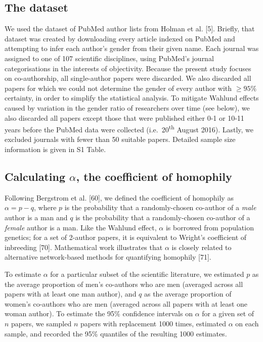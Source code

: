 \documentclass[12pt,]{article}
\begin{document}
\subsection{The dataset}\label{the-dataset}

We used the dataset of PubMed author lists from Holman et al. {[}5{]}.
Briefly, that dataset was created by downloading every article indexed
on PubMed and attempting to infer each author's gender from their given
name. Each journal was assigned to one of 107 scientific disciplines,
using PubMed's journal categorisations in the interests of objectivity.
Because the present study focuses on co-authorship, all single-author
papers were discarded. We also discarded all papers for which we could
not determine the gender of every author with \({\ge}95\%\) certainty,
in order to simplify the statistical analysis. To mitigate Wahlund
effects caused by variation in the gender ratio of researchers over time
(see below), we also discarded all papers except those that were
published either 0-1 or 10-11 years before the PubMed data were
collected (i.e.~20\textsuperscript{th} August 2016). Lastly, we excluded
journals with fewer than 50 suitable papers. Detailed sample size
information is given in S1 Table.

\subsection{\texorpdfstring{Calculating \(\alpha\), the coefficient of
homophily}{Calculating \textbackslash{}alpha, the coefficient of homophily}}\label{calculating-alpha-the-coefficient-of-homophily}

Following Bergstrom et al. {[}60{]}, we defined the coefficient of
homophily as \(\alpha = p - q\), where \(p\) is the probability that a
randomly-chosen co-author of a \emph{male} author is a man and \(q\) is
the probability that a randomly-chosen co-author of a \emph{female}
author is a man. Like the Wahlund effect, \(\alpha\) is borrowed from
population genetics; for a set of 2-author papers, it is equivalent to
Wright's coefficient of inbreeding {[}70{]}. Mathematical work
illustrates that \(\alpha\) is closely related to alternative
network-based methods for quantifying homophily {[}71{]}.

To estimate \(\alpha\) for a particular subset of the scientific
literature, we estimated \(p\) as the average proportion of men's
co-authors who are men (averaged across all papers with at least one man
author), and \(q\) as the average proportion of women's co-authors who
are men (averaged across all papers with at least one woman author). To
estimate the 95\% confidence intervals on \(\alpha\) for a given set of
\(n\) papers, we sampled \(n\) papers with replacement 1000 times,
estimated \(\alpha\) on each sample, and recorded the 95\% quantiles of
the resulting 1000 estimates.
\end{document}
